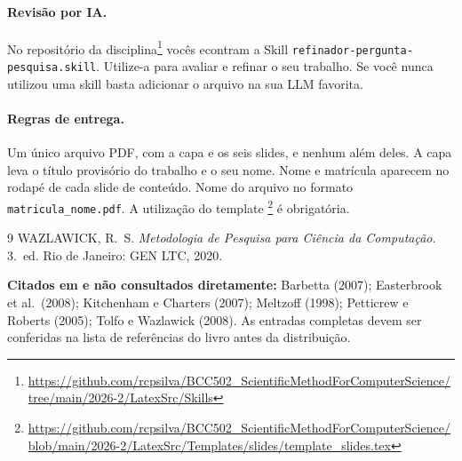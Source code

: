 \documentclass[10pt,a4paper]{extarticle}
\theoremstyle{definition}
\begin{document}
\paragraph{Revisão por IA.} No repositório da disciplina\footnote{\url{https://github.com/rcpsilva/BCC502_ScientificMethodForComputerScience/tree/main/2026-2/LatexSrc/Skills}} vocês econtram a Skill \texttt{refinador-pergunta-pesquisa.skill}. Utilize-a para avaliar e refinar o seu trabalho. Se você nunca utilizou uma skill basta adicionar o arquivo na sua LLM favorita.

\paragraph{Regras de entrega.} Um único arquivo PDF, com a capa e os seis slides, e nenhum além deles. A capa leva o título provisório do trabalho e o seu nome. Nome e matrícula aparecem no rodapé de cada slide de conteúdo. Nome do arquivo no formato \texttt{matricula\_nome.pdf}. A utilização do template \footnote{\url{https://github.com/rcpsilva/BCC502_ScientificMethodForComputerScience/blob/main/2026-2/LatexSrc/Templates/slides/template_slides.tex}} é obrigatória. 

\begin{thebibliography}{9}
 WAZLAWICK, R.\ S. \emph{Metodologia de Pesquisa para Ciência da Computação}. 3.\ ed. Rio de Janeiro: GEN LTC, 2020.
\end{thebibliography}

\textbf{Citados em \cite{wazlawick2020} e não consultados diretamente:} Barbetta (2007); Easterbrook et al.\ (2008); Kitchenham e Charters (2007); Meltzoff (1998); Petticrew e Roberts (2005); Tolfo e Wazlawick (2008). As entradas completas devem ser conferidas na lista de referências do livro antes da distribuição.
\end{document}

